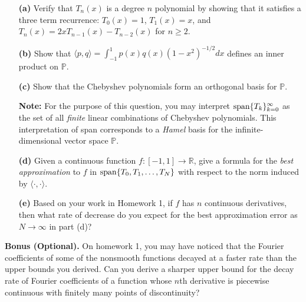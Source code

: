 \documentclass[12pt]{article}
\begin{document}
\begin{itemize}

	\item[\textbf{(a)}] Verify that $T_n(x)$ is a degree $n$ polynomial by showing that it satisfies a three term recurrence: $T_0(x)=1$, $T_1(x)=x$, and $T_n(x) = 2xT_{n-1}(x) - T_{n-2}(x)$ for $n\geq 2$. 

	\item[\textbf{(b)}] Show that $\langle p,q\rangle=\int_{-1}^1p(x)q(x)(1-x^2)^{-1/2}dx$ defines an inner product on $\mathbb{P}$. 

	\item[\textbf{(c)}] Show that the Chebyshev polynomials form an orthogonal basis for $\mathbb{P}$.

\noindent
\textbf{Note:} For the purpose of this question, you may interpret ${\rm span}\{T_k\}_{k=0}^\infty$ as the set of all \textit{finite} linear combinations of Chebyshev polynomials. This interpretation of span corresponds to a \textit{Hamel} basis for the infinite-dimensional vector space $\mathbb{P}$.

	\item[\textbf{(d)}] Given a continuous function $f:[-1,1]\rightarrow\mathbb{R}$, give a formula for the \textit{best approximation} to $f$ in ${\rm span}\{T_0,T_1,\ldots,T_N\}$ with respect to the norm induced by $\langle\cdot,\cdot\rangle$.

	\item[\textbf{(e)}] Based on your work in Homework 1, if $f$ has $n$ continuous derivatives, then what rate of decrease do you expect for the best approximation error as $N\rightarrow\infty$ in part (d)?

\end{itemize}

\noindent
\textbf{Bonus (Optional).} On homework 1, you may have noticed that the Fourier coefficients of some of the nonsmooth functions decayed at a faster rate than the upper bounds you derived. Can you derive a sharper upper bound for the decay rate of Fourier coefficients of a function whose $n$th derivative is piecewise continuous with finitely many points of discontinuity? 
\end{document}
